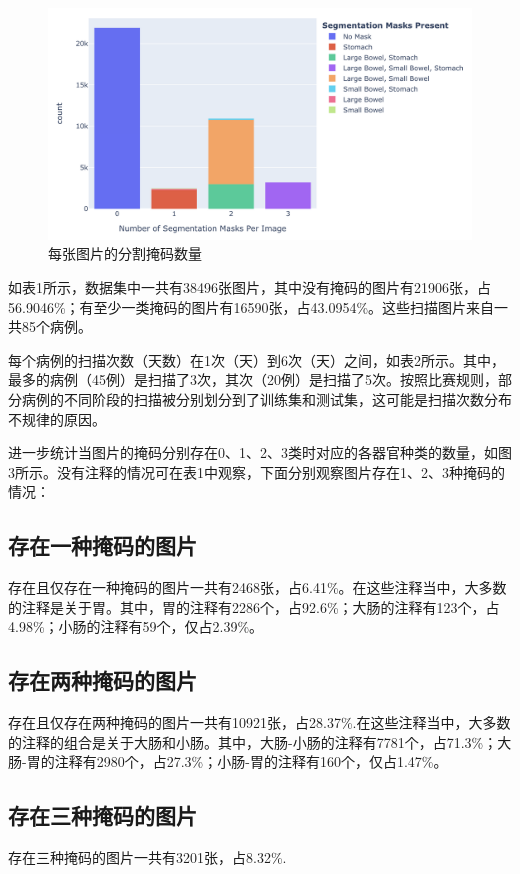 \documentclass[letterpaper, 10pt, conference, twoside]{ieeeconf}
\begin{document}
\begin{figure}[htbp]
  \centering
  \includegraphics[width = 1\linewidth]{nseg-per-img.png}
  \caption{每张图片的分割掩码数量}
  \label{fig:fig3}
\end{figure}

如表1所示，数据集中一共有38496张图片，其中没有掩码的图片有21906张，占56.9046\%；有至少一类掩码的图片有16590张，占43.0954\%。这些扫描图片来自一共85个病例。

每个病例的扫描次数（天数）在1次（天）到6次（天）之间，如表2所示。其中，最多的病例（45例）是扫描了3次，其次（20例）是扫描了5次。按照比赛规则，部分病例的不同阶段的扫描被分别划分到了训练集和测试集，这可能是扫描次数分布不规律的原因。

进一步统计当图片的掩码分别存在0、1、2、3类时对应的各器官种类的数量，如图3所示。没有注释的情况可在表1中观察，下面分别观察图片存在1、2、3种掩码的情况：

\subsection{存在一种掩码的图片}
存在且仅存在一种掩码的图片一共有2468张，占6.41\%。在这些注释当中，大多数的注释是关于胃。其中，胃的注释有2286个，占92.6\%；大肠的注释有123个，占4.98\%；小肠的注释有59个，仅占2.39\%。

\subsection{存在两种掩码的图片}
存在且仅存在两种掩码的图片一共有10921张，占28.37\%.在这些注释当中，大多数的注释的组合是关于大肠和小肠。其中，大肠-小肠的注释有7781个，占71.3\%；大肠-胃的注释有2980个，占27.3\%；小肠-胃的注释有160个，仅占1.47\%。

\subsection{存在三种掩码的图片}
存在三种掩码的图片一共有3201张，占8.32\%.
\end{document}
